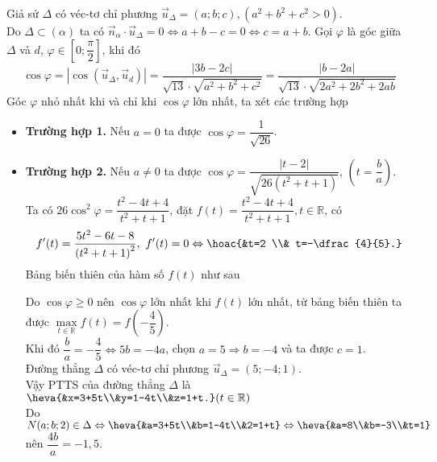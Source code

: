 \begin{ex}
{\begin{itemize}
			Giả sử $\Delta$ có véc-tơ chỉ phương $\overrightarrow{u}_{\Delta}=(a ; b ; c),\left(a^2+b^2+c^2>0\right)$.\\
			Do $\Delta \subset(\alpha)$ ta có $\overrightarrow{n}_\alpha \cdot \overrightarrow{u}_{\Delta}=0 \Leftrightarrow a+b-c=0 \Leftrightarrow c=a+b$.
			Gọi $\varphi$ là góc giữa $\Delta$ và $d$, $\varphi \in\left[0 ; \dfrac{\pi}{2}\right]$, khi đó
			$$
			\cos \varphi=\left|\cos \left(\overrightarrow{u}_{\Delta}, \overrightarrow{u}_d\right)\right|=\dfrac{|3 b-2 c|}{\sqrt{13} \cdot \sqrt{a^2+b^2+c^2}}=\dfrac{|b-2 a|}{\sqrt{13} \cdot \sqrt{2 a^2+2 b^2+2 a b}}
			$$
			Góc $\varphi$ nhỏ nhất khi và chỉ khi $\cos \varphi$ lớn nhất, ta xét các trường hợp
			\begin{itemize}
				\item \textbf{Trường hợp 1.} Nếu $a=0$ ta được $\cos \varphi=\dfrac{1}{\sqrt{26}}$.
				\item \textbf{Trường hợp 2.} Nếu $a \neq 0$ ta được $\cos \varphi=\dfrac{|t-2|}{\sqrt{26\left(t^2+t+1\right)}}$, $\left(t=\dfrac{b}{a}\right)$.\\
				Ta có $26 \cos ^2 \varphi=\dfrac{t^2-4 t+4}{t^2+t+1}$, đặt $f(t)=\dfrac{t^2-4 t+4}{t^2+t+1}, t \in \mathbb{R}$, có
				$$	f'(t)=\dfrac{5 t^2-6 t-8}{\left(t^2+t+1\right)^2},\ f'(t)=0 \Leftrightarrow\hoac{&t=2 \\&	t=-\dfrac{4}{5}.}$$
				Bảng biến thiên của hàm số $f(t)$ như sau
				\begin{center}
				\end{center}
				Do $\cos \varphi \geq 0$ nên $\cos \varphi$ lớn nhất khi $f(t)$ lớn nhất, từ bảng biến thiên ta được $\max\limits_{t \in \mathbb{R}} f(t)=f\left(-\dfrac{4}{5}\right)$.\\
				Khi đó $\dfrac{b}{a}=-\dfrac{4}{5} \Leftrightarrow 5 b=-4 a$, chọn $a=5 \Rightarrow b=-4$ và ta được $c=1$.\\
				Đường thẳng $\Delta$ có véc-tơ chỉ phương $\overrightarrow{u}_{\Delta}=(5 ;-4 ; 1)$.\\
				Vậy PTTS của đường thẳng $\Delta$ là $\heva{&x=3+5t\\&y=1-4t\\&z=1+t.} (t \in \mathbb{R})$\\
				Do $N(a;b;2) \in \Delta \Leftrightarrow \heva{&a=3+5t\\&b=1-4t\\&2=1+t} \Leftrightarrow\heva{&a=8\\&b=-3\\&t=1} $ nên $\dfrac{4b}{a}=-1{,}5$.
			\end{itemize}
		\end{itemize}
	}
\end{ex}

